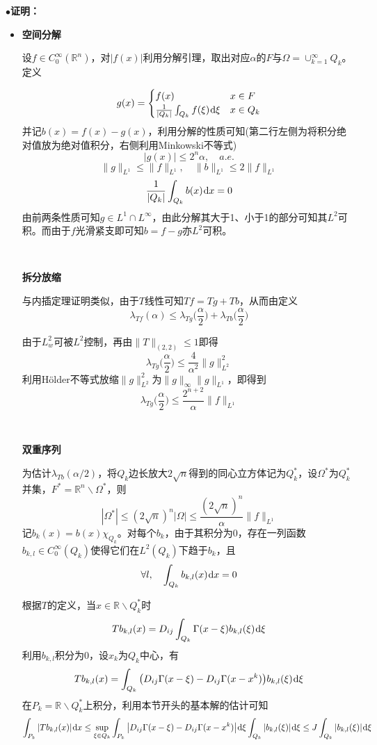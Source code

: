 \documentclass[a4paper,UTF8,fontset=windows,AutoFakeBold]{ctexart}
\newcommand*{\dr}{\hspace{0.07em}\mathrm{d}}
\newcommand{\proo}[1]{{\kaishu $\bullet$\textbf{证明：}
\begin{itemize}
    \item[] #1
\end{itemize}
}}
\begin{document}
\proo{
    \textbf{空间分解}

    设$f\in C_0^\infty(\mathbb{R}^n)$，对$|f(x)|$利用分解引理，取出对应$\alpha$的$F$与$\Omega=\cup_{k=1}^\infty Q_k$。定义

    $$g(x)=\begin{cases}f(x)&x\in F\\\frac{1}{|Q_k|}\int_{Q_k}f(\xi)\dr\xi&x\in Q_k\end{cases}$$
    并记$b(x)=f(x)-g(x)$，利用分解的性质可知(第二行左侧为将积分绝对值放为绝对值积分，右侧利用Minkowski不等式)
    $$|g(x)|\le 2^n\alpha,\quad a.e.$$
    $$\|g\|_{L^1}\le\|f\|_{L^1},\quad\|b\|_{L^1}\le 2\|f\|_{L^1}$$
    $$\frac{1}{|Q_k|}\int_{Q_k}b(x)\dr x=0$$
    由前两条性质可知$g\in L^1\cap L^\infty$，由此分解其大于1、小于1的部分可知其$L^2$可积。而由于$f$光滑紧支即可知$b=f-g$亦$L^2$可积。

    \

    \textbf{拆分放缩}

    与内插定理证明类似，由于$T$线性可知$Tf=Tg+Tb$，从而由定义
    $$\lambda_{Tf}(\alpha)\le\lambda_{Tg}\bigg(\frac{\alpha}{2}\bigg)+\lambda_{Tb}\bigg(\frac{\alpha}{2}\bigg)$$

    由于$L_w^2$可被$L^2$控制，再由$\|T\|_{(2,2)}\le1$即得
    $$\lambda_{Tg}\bigg(\frac{\alpha}{2}\bigg)\le\frac{4}{\alpha^2}\|g\|_{L^2}^2$$
    利用H\"older不等式放缩$\|g\|_{L^2}^2$为$\|g\|_\infty\|g\|_{L^1}$，即得到
    $$\lambda_{Tg}\bigg(\frac{\alpha}{2}\bigg)\le\frac{2^{n+2}}{\alpha}\|f\|_{L^1}$$

    \

    \textbf{双重序列}

    为估计$\lambda_{Tb}(\alpha/2)$，将$Q_k$边长放大$2\sqrt{n}$得到的同心立方体记为$Q_k^*$，设$\Omega^*$为$Q_k^*$并集，$F^*=\mathbb{R}^n\backslash\Omega^*$，则
    $$|\Omega^*|\le(2\sqrt{n})^n|\Omega|\le\frac{(2\sqrt{n})^n}{\alpha}\|f\|_{L^1}$$
    记$b_k(x)=b(x)\chi_{Q_k}$。对每个$b_k$，由于其积分为0，存在一列函数$b_{k,l}\in C_0^\infty(Q_k)$使得它们在$L^2(Q_k)$下趋于$b_k$，且
    $$\forall l,\quad\int_{Q_k}b_{k,l}(x)\dr x=0$$

    根据$T$的定义，当$x\in \mathbb{R}\backslash Q_k^*$时
    $$Tb_{k,l}(x)=D_{ij}\int_{Q_k}\Gamma(x-\xi)b_{k,l}(\xi)\dr\xi$$
    利用$b_{k,l}$积分为0，设$x_k$为$Q_k$中心，有
    $$Tb_{k,l}(x)=\int_{Q_k}\big(D_{ij}\Gamma(x-\xi)-D_{ij}\Gamma(x-x^k)\big)b_{k,l}(\xi)\dr\xi$$
    在$P_k=\mathbb{R}\backslash Q_k^*$上积分，利用本节开头的基本解的估计可知
    $$\int_{P_k}|Tb_{k,l}(x)|\dr x\le\sup_{\xi\in Q_k}\int_{P_k}\big|D_{ij}\Gamma(x-\xi)-D_{ij}\Gamma(x-x^k)\big|\dr\xi\int_{Q_k}|b_{k,l}(\xi)|\dr\xi\le J\int_{Q_k}|b_{k,l}(\xi)|\dr\xi$$

}
\end{document}
